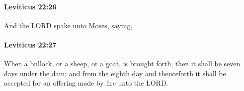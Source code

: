 		\paragraph{Leviticus 22:26} %
			\label{LEVITICUS-22-26}

			And the LORD spake unto Moses, saying,


		\paragraph{Leviticus 22:27} %
			\label{LEVITICUS-22-27}

			When a bullock, or a sheep, or a goat, is brought forth, then it shall be seven days under the dam; and from the eighth day and thenceforth it shall be accepted for an offering made by fire unto the LORD.


